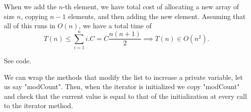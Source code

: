  

When we add the $n$-th element, we have total cost of allocating a new array of size $n$, copying $n-1$ elements, and then adding the new element.
Assuming that all of this runs in $O(n)$, we have a total time of  \[
T(n) \le  \sum_{i=1}^{n} i.C = C \frac{n(n+1)}{2} \implies T(n) \in O(n^2)
.\] 


\begin{algorithm*}
\end{algorithm*}


See code.


We can wrap the methods that modify the list to increase a private variable, let us say "modCount".
Then, when the iterator is initialized we copy "modCount" and check that the current value is equal to that of the initialization at every call to the iterator method.


